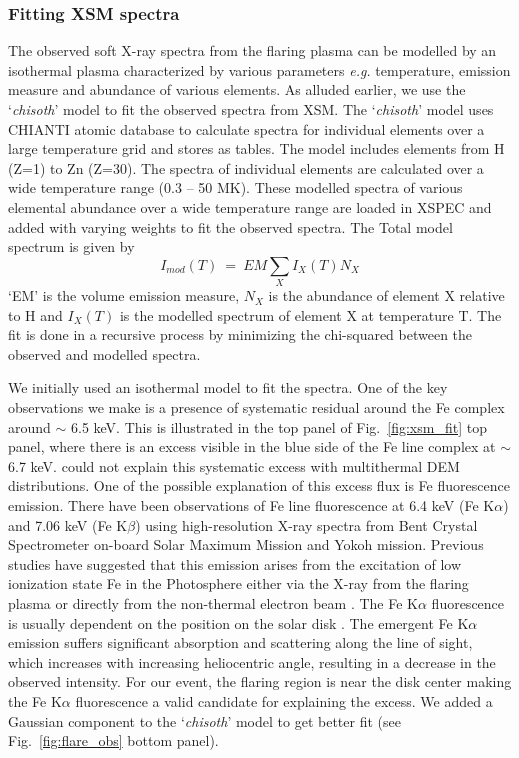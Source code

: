 \subsubsection{Fitting XSM spectra}\label{sec:xsm-fit}

The observed soft X-ray spectra from the flaring plasma can be modelled by an isothermal plasma characterized by various parameters {\it e.g.} temperature, emission measure and abundance of various elements. As alluded earlier, we use the `{\it chisoth}' model \citep{mondal21} to fit the observed spectra from XSM. The `{\it chisoth}' model uses CHIANTI atomic database \cite{chianti} to calculate spectra for individual elements over a large temperature grid and stores as tables. The model includes elements from H (Z=1) to Zn (Z=30). The spectra of individual elements are calculated over a wide temperature range (0.3 {--} 50 MK). These modelled spectra of various elemental abundance over a wide temperature range are loaded in XSPEC and added with varying weights to fit the observed spectra. The Total model spectrum is given by  $$I_{mod}(T)~=~EM\sum_{X}I_{X}(T)N_{X}$$`EM' is the volume emission measure, $N_{X}$ is the abundance of element X relative to H and $I_{X}(T)$ is the modelled spectrum of element X at temperature T. The fit is done in a recursive process by minimizing the chi-squared between the observed and modelled spectra.

We initially used an isothermal model to fit the spectra. One of the key observations we make is a presence of systematic residual around the Fe complex around $\sim$ 6.5 keV. This is illustrated in the top panel of Fig.~\ref{fig:xsm_fit} top panel, where there is an excess visible in the blue side of the Fe line complex at $\sim$ 6.7 keV. \cite{mithun22} could not explain this systematic excess with multithermal DEM distributions. One of the possible explanation of this excess flux is Fe fluorescence emission. There have been observations of Fe line fluorescence at 6.4 keV (Fe K$\alpha$) and 7.06 keV (Fe K$\beta$) \citep{neupert67,doscheck71,bai79,tanaka84,parmar84,phillips12} using high-resolution X-ray spectra from Bent Crystal Spectrometer on-board Solar Maximum Mission \citep[Bent/{\it SMM},][]{bent,smm} and Yokoh \citep{yokoh} mission. Previous studies have suggested that this emission arises from the excitation of low ionization state Fe in the Photosphere either via the X-ray from the flaring plasma \citep{bai79} or directly from the non-thermal electron beam \citep{phillips73}. The Fe K$\alpha$ fluorescence is usually dependent on the position on the solar disk \citep{parmar84}. The emergent Fe K$\alpha$ emission suffers significant absorption and scattering along the line of sight, which increases with increasing heliocentric angle, resulting in a decrease in the observed intensity. For our event, the flaring region is near the disk center making the Fe K$\alpha$ fluorescence a valid candidate for explaining the excess. We added a Gaussian component to the `{\it chisoth}' model to get better fit (see Fig.~\ref{fig:flare_obs} bottom panel).

